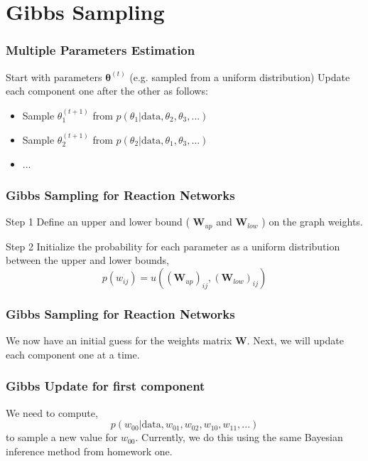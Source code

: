 \documentclass{beamer}
\begin{document}
\section{Gibbs Sampling}

\begin{frame}
\frametitle{Multiple Parameters Estimation}
Start with parameters $\bm{\theta}^{\left( t\right)}$ (e.g. sampled from a uniform distribution)
Update each component one after the other as follows:
\begin{itemize}
\item Sample $\theta^{\left( t + 1 \right)}_{1}$ from $p \left( \theta_{1} | \text{data}, \theta_{2}, \theta_{3}, ... \right)$
\item Sample $\theta^{\left( t+1 \right)}_{2}$ from $p \left( \theta_{2} | \text{data}, \theta_{1}, \theta_{3}, ... \right)$
\item ...
\end{itemize}
\end{frame}

\begin{frame}
\frametitle{Gibbs Sampling for Reaction Networks}

\begin{block}{Step 1}
Define an upper and lower bound ( $\bm{W}_{up}$ and $\bm{W}_{low}$ ) on the graph weights.
\end{block}

\begin{block}{Step 2}
Initialize the probability for each parameter as a uniform distribution between the upper and lower bounds,
\[
p\left(w_{ij}\right)=u\left(\left( \bm{W}_{up} \right)_{ij}, \left( \bm{W}_{low} \right)_{ij} \right)
\]
\end{block}

\end{frame}

\begin{frame}
\frametitle{Gibbs Sampling for Reaction Networks}

We now have an initial guess for the weights matrix $\bm{W}$. Next, we will update each component one at a time.

\end{frame}

\begin{frame}
\frametitle{Gibbs Update for first component}
We need to compute,
\[
p\left(w_{00}|\text{data},w_{01},w_{02},w_{10},w_{11},...\right)
\]
to sample a new value for $w_{00}$. Currently, we do this using the same Bayesian inference method from homework one.
\end{frame}
\end{document}
